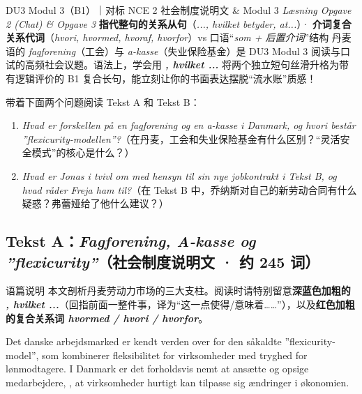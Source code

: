 {DU3 Modul 3（B1）｜对标 NCE 2 社会制度说明文 \& Modul 3 \textit{Læsning Opgave 2 (Chat) \& Opgave 3}}
{\textbf{指代整句的关系从句}（\textit{..., hvilket betyder, at...}）· \textbf{介词复合关系代词}（\textit{hvori, hvormed, hvoraf, hvorfor}）vs 口语“\textit{som + 后置介词}”结构}
{丹麦语的 \textit{fagforening}（工会）与 \textit{a-kasse}（失业保险基金）是 DU3 Modul 3 阅读与口试的高频社会议题。语法上，学会用 \textbf{\textit{, hvilket ...}} 将两个独立短句丝滑升格为带有逻辑评价的 B1 复合长句，能立刻让你的书面表达摆脱“流水账”质感！}

\begin{foerduleaeser}
带着下面两个问题阅读 Tekst A 和 Tekst B：
\begin{enumerate}
  \item \textit{Hvad er forskellen på en fagforening og en a-kasse i Danmark, og hvori består ”flexicurity-modellen”?}（在丹麦，工会和失业保险基金有什么区别？“灵活安全模式”的核心是什么？）
  \item \textit{Hvad er Jonas i tvivl om med hensyn til sin nye jobkontrakt i Tekst B, og hvad råder Freja ham til?}（在 Tekst B 中，乔纳斯对自己的新劳动合同有什么疑惑？弗蕾娅给了他什么建议？）
\end{enumerate}
\end{foerduleaeser}


\subsection*{Tekst A：\textit{Fagforening, A-kasse og ”flexicurity”}（社会制度说明文 · 约 245 词）}

\begin{tipbox}{语篇说明}
本文剖析丹麦劳动力市场的三大支柱。阅读时请特别留意\textbf{\color{NCDNavy}深蓝色加粗的 \textit{, hvilket ...}}（回指前面一整件事，译为“这一点使得/意味着……”），以及\textbf{\color{NCDRed}红色加粗的复合关系词 \textit{hvormed / hvori / hvorfor}}。
\end{tipbox}

Det danske arbejdsmarked er kendt verden over for den såkaldte ”flexicurity-model”, som kombinerer fleksibilitet for virksomheder med tryghed for lønmodtagere. I Danmark er det forholdsvis nemt at ansætte og opsige medarbejdere, , at virksomheder hurtigt kan tilpasse sig ændringer i økonomien.

